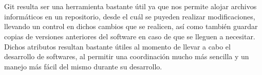 \documentclass[10pt,a4paper]{article} %
\begin{document}
	\pagebreak
	
	
	\section{\color{colorIPN}{Conclusión}}
	{\large Git resulta ser una herramienta bastante {\' u}til ya que nos permite alojar archivos inform{\' a}ticos en un repositorio, desde el cu{\' a}l se puyeden realizar modificaciones, llevando un control en dichos cambios que se realicen, as{\' i} como tambi{\' e}n guardar copias de versiones anteriores del software en caso de que se lleguen a necesitar. Dichos atributos resultan bastante {\' u}tiles al momento de llevar a cabo el desarrollo de softwares, al permitir una coordinación mucho más sencilla y un manejo más fácil del mismo durante su desarrollo.}
	
	
	\pagebreak
	
	
	\section{\color{colorIPN}{Referencias Bibliográficas}}
	
\end{document}
